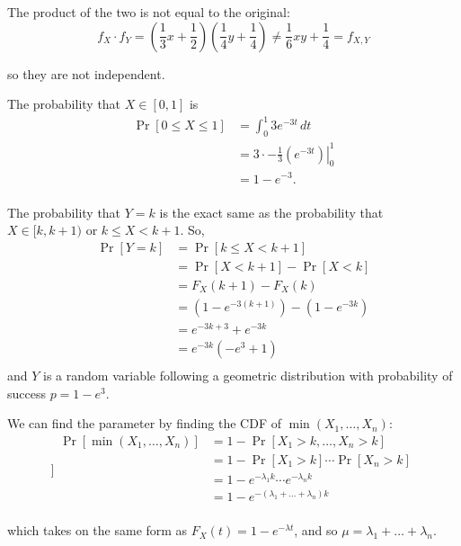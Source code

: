 \documentclass[11pt]{article}
\begin{document}
\begin{solution}
\begin{Parts}
The product of the two is not equal to the original:
\[
    f_X \cdot f_Y = \left( \frac{1}{3}x + \frac{1}{2} \right) 
    \left( \frac{1}{4}y + \frac{1}{4} \right) \neq \frac{1}{6}xy+\frac{1}{4} = f_{X,Y}
\]

so they are not independent. 

\Part The probability that $X \in [0, 1]$ is
\[
    \begin{split}
        \Pr[0 \leq X \leq 1] &= \int_{0}^{1} 3e^{-3t} \, dt \\
        &= 3 \cdot -\frac{1}{3} \left. (e^{-3t}) \right|_0^1 \\
        &= 1-e^{-3}. \\
    \end{split}
\]

The probability that $Y=k$ is the exact same as the probability that 
$X \in [k, k+1)$ or $k \leq X < k+1$. So, 
\[
    \begin{split}
        \Pr[Y=k] &= \Pr[k \leq X < k+1] \\
        &= \Pr[X < k+1] - \Pr[X < k] \\
        &= F_X(k+1) - F_X(k) \\
        &= (1-e^{-3(k+1)}) - (1-e^{-3k}) \\
        &= e^{-3k + 3} + e^{-3k} \\
        &= e^{-3k}(-e^3+1) \\
    \end{split}
\]
and $Y$ is a random variable following a geometric distribution with probability
of success $p=1-e^3$. 

\Part We can find the parameter by finding the CDF of $\min(X_1, \dots, X_n)$:
\[
    ]\begin{split}
        \Pr[\min(X_1, \dots, X_n)] &= 1 - \Pr[X_1 > k, \dots, X_n > k] \\
        &= 1 - \Pr[X_1 > k] \cdots \Pr[X_n > k] \\
        &= 1 - e^{-\lambda_1 k} \cdots e^{-\lambda_n k} \\
        &= 1 - e^{-(\lambda_1 + \dots + \lambda_n) k} \\
    \end{split}
\]

which takes on the same form as $F_X(t) = 1 - e^{-\lambda t}$, and so $\mu = 
\lambda_1 + \dots + \lambda_n$.

\end{Parts}

\end{solution}
\end{document}
